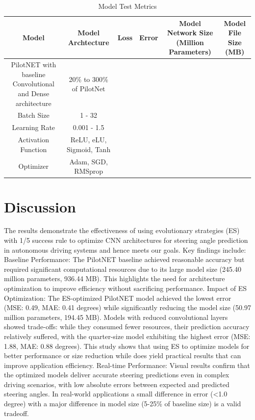 \documentclass[conference]{IEEEtran}
\begin{document}
\begin{table}[h]
    \centering
    \caption{Model Test Metrics}
    \begin{tabular}{c|c|c|c|c|c}
    
        \textbf{Model}  & \textbf{Model Archtecture} & \textbf{Loss} & \textbf{Error} & \textbf{Model Network Size (Million Parameters)} & \textbf{Model File Size (MB)} \\
        \hline
        PilotNET with baseline Convolutional and Dense architecture & 20\% to 300\% of PilotNet \\
        Batch Size              & 1 - 32                    \\
        Learning Rate           & 0.001 - 1.5               \\
        Activation Function     & ReLU, eLU, Sigmoid, Tanh  \\
        Optimizer               & Adam, SGD, RMSprop        \\
        
    \end{tabular}
    \label{tab:testmetrics}
\end{table}

\section{Discussion}
The results demonstrate the effectiveness of using evolutionary strategies (ES) with 1/5 success rule to optimize CNN architectures for steering angle prediction in autonomous driving systems and hence meets our goals. Key findings include:
Baseline Performance: The PilotNET baseline achieved reasonable accuracy but required significant computational resources due to its large model size (245.40 million parameters, 936.44 MB).
This highlights the need for architecture optimization to improve efficiency without sacrificing performance.
Impact of ES Optimization: The ES-optimized PilotNET model achieved the lowest error (MSE: 0.49, MAE: 0.41 degrees) while significantly reducing the model size (50.97 million parameters, 194.45 MB). Models with reduced convolutional layers showed trade-offs: while they consumed fewer resources, their prediction accuracy relatively suffered, with the quarter-size model exhibiting the highest error (MSE: 1.88, MAE: 0.88 degrees). This study shows that using ES to optimize models for better performance or size reduction while does yield practical results that can improve application efficiency.
Real-time Performance: Visual results confirm that the optimized models deliver accurate steering predictions even in complex driving scenarios, with low absolute errors between expected and predicted steering angles. In real-world applications a small difference in error (<1.0 degree) with a major difference in model size (5-25\% of baseline size) is a valid tradeoff.
\end{document}
